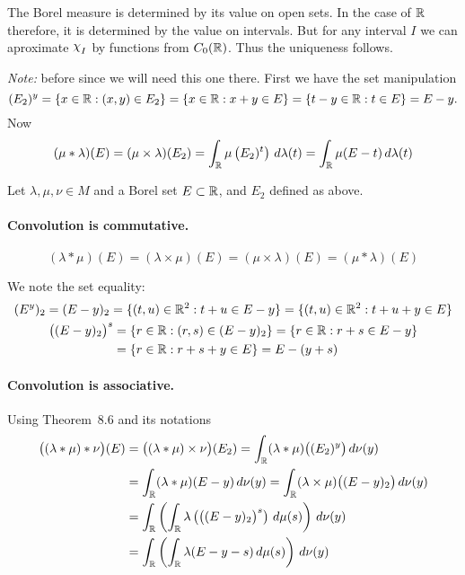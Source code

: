 \begin{enumerate}
\begin{itemize}
The Borel measure is determined by its value on open sets.
In the case of \(\mathbb{R}\) therefore, it is determined by the value on intervals.
But for any interval $I$ we can aproximate \(\chhi_I\) by functions
from \(C_0(\mathbb{R})\). Thus the uniqueness follows.

\emph{Note:} before  since we will need this one there.
First we have the set manipulation
\begin{equation*}
(E_2)^y 
= \{x\in\mathbb{R}: (x,y)\in E_2\}
= \{x\in\mathbb{R}: x+y\in E\}
= \{t-y\in\mathbb{R}: t\in E\}
= E - y.
\end{equation*}
Now
\begin{equation*}
(\mu \ast \lambda)(E) 
= (\mu\times\lambda)(E_2) 
= \int_{\mathbb{R}} \mu\left(E_2)^t\right)\,d\lambda(t)
= \int_{\mathbb{R}} \mu(E-t)\,d\lambda(t)
\end{equation*}

Let \(\lambda,\mu,\nu\in M\) and a Borel set \(E\subset\mathbb{R}\),
and \(E_2\) defined as above.

\paragraph{Convolution is commutative.}
\begin{equation*}
(\lambda\ast \mu)(E)
= (\lambda\times\mu)(E)
= (\mu\times\lambda)(E)
= (\mu\ast\lambda)(E)
\end{equation*}

We note the set equality:
\begin{gather*}
(E^y)_2 = (E-y)_2 
 = \{(t,u)\in\R^2: t+u\in E-y\}
 = \{(t,u)\in\R^2: t+u+y\in E\} \\
%
\begin{align*}
\bigl((E-y)_2\bigr)^s 
&= \{r\in\R: (r,s)\in (E-y)_2\}
 = \{r\in\R: r+s\in E-y\} \\
&= \{r\in\R: r+s+y\in E\}
 = E-(y+s)
\end{align*}
\end{gather*}

\paragraph{Convolution is associative.}
Using Theorem~8.6 and its notations
\begin{align*}
\bigl((\lambda\ast \mu)\ast \nu\bigr)(E)
&=\bigl((\lambda\ast \mu)\times \nu\bigr)(E_2)
 = \int_{\mathbb{R}} (\lambda\ast \mu)\bigl((E_2)^y\bigr)\,d\nu(y) \\
&= \int_{\mathbb{R}} (\lambda\ast \mu)(E-y)\,d\nu(y) 
 = \int_{\mathbb{R}} (\lambda\times \mu)\bigl((E-y)_2\bigr)\,d\nu(y) \\
&= \int_{\mathbb{R}} 
   \left(
      \int_{\mathbb{R}}\lambda\left(\bigl((E-y)_2\bigr)^s\right)\,d\mu(s)
   \right)\,d\nu(y) \\
&= \int_{\mathbb{R}} \left(\int_{\mathbb{R}}\lambda(E-y-s)\,d\mu(s)\right)\,d\nu(y)
\end{align*}


\end{itemize}
\end{enumerate}
